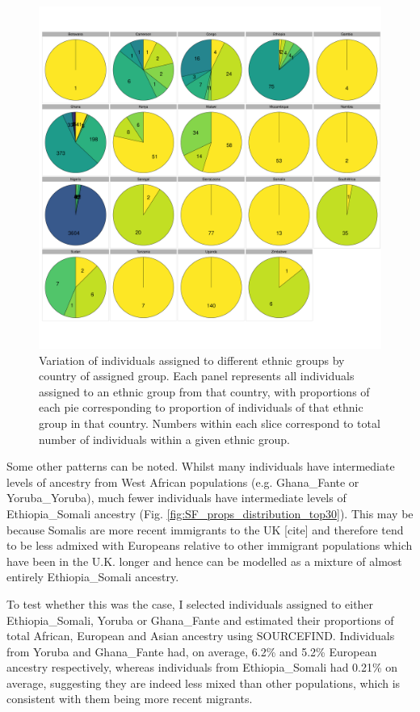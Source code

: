 \begin{figure}[htp]
    \centering
    \includegraphics[width=1.0\textwidth]{../images/chapter3/all_countries_SF_props_pie_chart.pdf}
    \caption{Variation of individuals assigned to different ethnic groups by country of assigned group. Each panel represents all individuals assigned to an ethnic group from that country, with proportions of each pie corresponding to proportion of individuals of that ethnic group in that country. Numbers within each slice correspond to total number of individuals within a given ethnic group.}
    \label{fig:all_countries_SF_props_pie_chart}
\end{figure}

Some other patterns can be noted. Whilst many individuals have intermediate levels of ancestry from West African populations (e.g. Ghana\_Fante or Yoruba\_Yoruba), much fewer individuals have intermediate levels of Ethiopia\_Somali ancestry (Fig. \ref{fig:SF_props_distribution_top30}). This may be because Somalis are more recent immigrants to the UK [cite] and therefore tend to be less admixed with Europeans relative to other immigrant populations which have been in the U.K. longer and hence can be modelled as a mixture of almost entirely Ethiopia\_Somali ancestry. 

To test whether this was the case, I selected individuals assigned to either Ethiopia\_Somali, Yoruba or Ghana\_Fante and estimated their proportions of total African, European and Asian ancestry using SOURCEFIND. Individuals from Yoruba and Ghana\_Fante had, on average, 6.2\% and 5.2\% European ancestry respectively, whereas individuals from Ethiopia\_Somali had 0.21\% on average, suggesting they are indeed less mixed than other populations, which is consistent with them being more recent migrants. 

